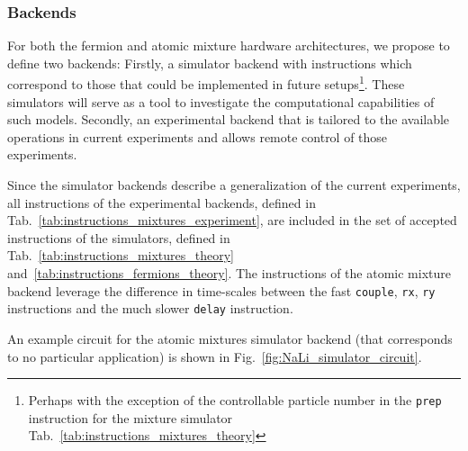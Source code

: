 \documentclass[a4paper, 10pt]{article}
\begin{document}
\subsubsection{Backends}

For both the fermion and atomic mixture hardware architectures, we propose to define two backends: Firstly, a simulator backend with instructions which correspond to those that could be implemented in future setups\footnote{Perhaps with the exception of the controllable particle number in the \texttt{prep} instruction for the mixture simulator Tab.~\ref{tab:instructions_mixtures_theory}}.
These simulators will serve as a tool to investigate the computational capabilities of such models.  
Secondly, an experimental backend that is tailored to the available operations in current experiments and allows remote control of those experiments.

Since the simulator backends describe a generalization of the current experiments, all instructions of the experimental backends, defined in Tab.~\ref{tab:instructions_mixtures_experiment}, are included in the set of accepted instructions of the simulators, defined in Tab.~\ref{tab:instructions_mixtures_theory} and~\ref{tab:instructions_fermions_theory}.
The instructions of the atomic mixture backend leverage the difference in time-scales between the fast \texttt{couple}, \texttt{rx}, \texttt{ry} instructions and the much slower \texttt{delay} instruction.

An example circuit for the atomic mixtures simulator backend (that corresponds to no particular application) is shown in Fig.~\ref{fig:NaLi_simulator_circuit}.
    
\end{document}
